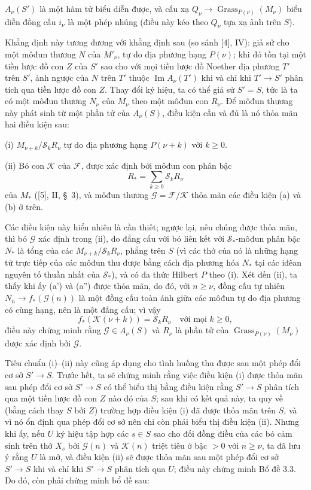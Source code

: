  $A_\nu(S')$ là một hàm tử biểu diễn được, và cấu xạ
$Q_\nu\longrightarrow\operatorname{Grass}_{P(\nu)}(M_\nu)$ biểu diễn đồng cấu
$i_\nu$ là một phép nhúng (điều này kéo theo $Q_\nu$ tựa xạ ảnh trên $S$).

Khẳng định này tương đương với khẳng định sau (so sánh [4], IV): giả sử cho
một môđun thương $N$ của $M'_\nu$, tự do địa phương hạng $P(\nu)$; khi đó tồn
tại một tiền lược đồ con $Z$ của $S'$ sao cho với mọi tiền lược đồ Noether địa
phương $T'$
trên $S'$, ảnh ngược của $N$ trên $T'$ thuộc
$\operatorname{Im}A_\nu(T')$ khi và chỉ khi $T'\longrightarrow S'$ phân tích
qua tiền lược đồ con $Z$. Thay đổi ký hiệu, ta có thể giả sử $S'=S$, tức là ta
có một môđun thương $N_\nu$ của $M_\nu$ theo một môđun con $R_\nu$. Để môđun
thương này phát sinh từ một phần tử của $A_\nu(S)$, điều kiện cần và đủ là nó
thỏa mãn hai điều kiện sau:

\medskip
\noindent (i) $M_{\nu+k}/\mathcal S_kR_\nu$ tự do địa phương hạng
$P(\nu+k)$ với $k\geq0$.

\smallskip
\noindent (ii) Bó con $\mathcal K$ của $\mathcal F$, được xác định bởi môđun
con phân bậc
\[
R_* =\sum_{k\geq0}\mathcal S_kR_\nu
\]
của $M_*$ ([5], II, \S~3), và môđun thương
$\mathcal G=\mathcal F/\mathcal K$ thỏa mãn các điều kiện (a) và (b) ở trên.

Các điều kiện này hiển nhiên là cần thiết; ngược lại, nếu chúng được thỏa mãn,
thì bó $\mathcal G$ xác định trong (ii), do đẳng cấu với bó liên kết với
$\mathcal S_*$-môđun phân bậc $N_*$ là tổng của các
$M_{\nu+k}/\mathcal S_kR_\nu$, phẳng trên $S$ (vì các thớ của nó là những hạng
tử trực tiếp của các môđun thu được bằng cách địa phương hóa $N_*$ tại các
iđêan nguyên tố thuần nhất của $\mathcal S_*$), và có đa thức Hilbert $P$ theo
(i). Xét đến (ii), ta
thấy khi ấy (a') và (a'') được thỏa mãn, do đó, với $n\geq\nu$, đồng cấu tự
nhiên $N_n\longrightarrow f_*(\mathcal G(n))$ là một đồng cấu toàn ánh giữa
các môđun tự do địa phương có cùng hạng, nên là một đẳng cấu; vì vậy
\[
f_*(\mathcal K(\nu+k))=\mathcal S_kR_\nu
\quad\text{với mọi $k\geq0$},
\]
điều này chứng minh rằng $\mathcal G\in A_\nu(S)$ và $R_\nu$ là phần tử của
$\operatorname{Grass}_{P(\nu)}(M_\nu)$ được xác định bởi $\mathcal G$.

Tiêu chuẩn (i)--(ii) này cũng áp dụng cho tình huống thu được sau một phép đổi
cơ sở $S'\longrightarrow S$. Trước hết, ta sẽ chứng minh rằng việc điều kiện
(i) được thỏa mãn sau phép đổi cơ sở $S'\longrightarrow S$ có thể biểu thị
bằng điều kiện rằng $S'\longrightarrow S$ phân tích qua một tiền lược đồ con
$Z$ nào đó của $S$; sau khi có kết quả này, ta quy về (bằng cách thay $S$ bởi
$Z$) trường hợp điều kiện (i) đã được thỏa mãn trên $S$, và vì nó ổn định qua
phép đổi cơ sở nên chỉ còn phải biểu thị điều kiện (ii). Nhưng khi ấy, nếu $U$
ký hiệu tập hợp các $s\in S$ sao cho đối đồng điều của các bó cảm sinh trên thớ
$X_s$ bởi $\mathcal G(n)$ và $\mathcal K(n)$ triệt tiêu ở bậc $>0$ với
$n\geq\nu$, ta đã lưu ý rằng $U$ là mở, và điều kiện (ii) sẽ được thỏa mãn sau
một phép đổi cơ sở $S'\longrightarrow S$ khi và chỉ khi
$S'\longrightarrow S$ phân tích qua $U$; điều này chứng minh Bổ đề 3.3. Do đó,
còn phải chứng minh bổ đề sau:

